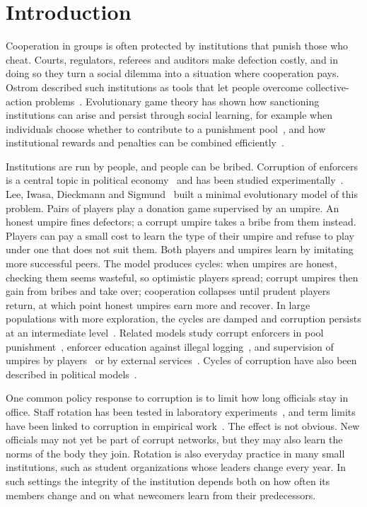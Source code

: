 \documentclass[11pt]{article}
\begin{document}
\section{Introduction}

Cooperation in groups is often protected by institutions that punish those who cheat. Courts,
regulators, referees and auditors make defection costly, and in doing so they turn a social
dilemma into a situation where cooperation pays. Ostrom described such institutions as tools that
let people overcome collective-action problems~\cite{ostrom1990commons}. Evolutionary game theory
has shown how sanctioning institutions can arise and persist through social learning, for example
when individuals choose whether to contribute to a punishment pool~\cite{sigmund2010social}, and
how institutional rewards and penalties can be combined
efficiently~\cite{sasaki2014optional,chen2015carrot}.

Institutions are run by people, and people can be bribed. Corruption of enforcers is a central
topic in political economy~\cite{roseackerman2016corruption} and has been studied
experimentally~\cite{muthukrishna2017corrupting}. Lee, Iwasa, Dieckmann and
Sigmund~\cite{lee2019social} built a minimal evolutionary model of this problem. Pairs of players
play a donation game supervised by an umpire. An honest umpire fines defectors; a corrupt umpire
takes a bribe from them instead. Players can pay a small cost to learn the type of their umpire
and refuse to play under one that does not suit them. Both players and umpires learn by imitating
more successful peers. The model produces cycles: when umpires are honest, checking them seems
wasteful, so optimistic players spread; corrupt umpires then gain from bribes and take over;
cooperation collapses until prudent players return, at which point honest umpires earn more and
recover. In large populations with more exploration, the cycles are damped and corruption
persists at an intermediate level~\cite{lee2019social}. Related models study corrupt enforcers
in pool punishment~\cite{liu2019corrupt}, enforcer education against illegal
logging~\cite{lee2015logging}, and supervision of umpires by
players~\cite{shi2023bidirectional} or by external services~\cite{zhou2023supervision}. Cycles of
corruption have also been described in political models~\cite{bicchieri1997cycles}.

One common policy response to corruption is to limit how long officials stay in office. Staff
rotation has been tested in laboratory experiments~\cite{abbink2004rotation,buhren2020rotation},
and term limits have been linked to corruption in empirical
work~\cite{ferraz2011electoral,laurent2021horizon}. The effect is not obvious. New officials may
not yet be part of corrupt networks, but they may also learn the norms of the body they join.
Rotation is also everyday practice in many small institutions, such as student organizations
whose leaders change every year. In such settings the integrity of the institution depends both
on how often its members change and on what newcomers learn from their predecessors.
\end{document}
